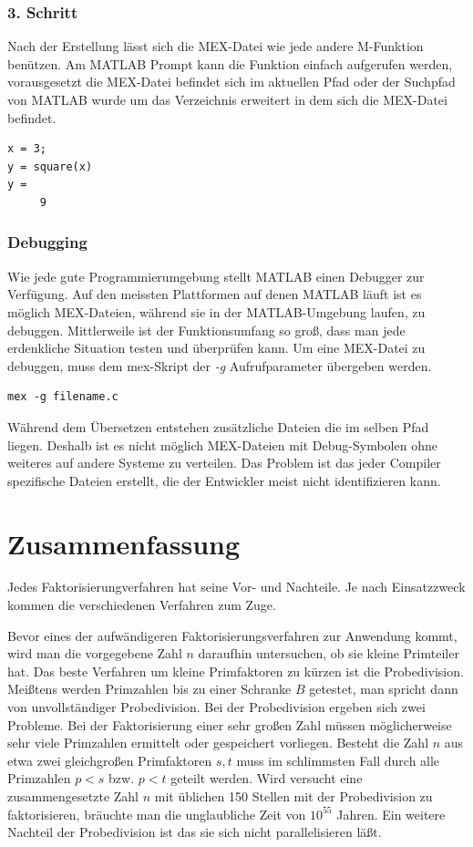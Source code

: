 \documentclass[a4paper,11pt]{article}
\begin{document}
\subsubsection*{3. Schritt}
Nach der Erstellung lässt sich die MEX-Datei wie jede
andere M-Funktion benützen. Am MATLAB Prompt kann die
Funktion einfach aufgerufen werden, vorausgesetzt die
MEX-Datei befindet sich im aktuellen Pfad oder der Suchpfad
von MATLAB wurde um das Verzeichnis erweitert in dem sich
die MEX-Datei befindet.
\begin{verbatim}
x = 3;
y = square(x)
y =
     9
\end{verbatim}

\subsubsection*{Debugging}
Wie jede gute Programmierumgebung stellt MATLAB einen Debugger zur Verfügung.
Auf den meissten Plattformen auf denen MATLAB läuft ist es möglich MEX-Dateien,
während sie in der MATLAB-Umgebung laufen, zu debuggen. Mittlerweile ist der 
Funktionsumfang so groß, dass man jede erdenkliche Situation testen und 
überprüfen kann. Um eine MEX-Datei zu debuggen, muss dem mex-Skript der
\textit{-g} Aufrufparameter übergeben werden. 
\begin{verbatim}
mex -g filename.c
\end{verbatim}

Während dem Übersetzen entstehen zusätzliche Dateien die im selben Pfad 
liegen. Deshalb ist es nicht möglich MEX-Dateien mit Debug-Symbolen ohne
weiteres auf andere Systeme zu verteilen. Das Problem ist das jeder Compiler
spezifische Dateien erstellt, die der Entwickler meist nicht identifizieren
kann.

\section{Zusammenfassung}
Jedes Faktorisierungverfahren hat seine Vor- und Nachteile. Je nach Einsatzzweck
kommen die verschiedenen Verfahren zum Zuge. 

Bevor eines der aufwändigeren Faktorisierungsverfahren zur Anwendung kommt, wird
man die vorgegebene Zahl $n$ daraufhin untersuchen, ob sie kleine Primteiler hat.
Das beste Verfahren um  kleine Primfaktoren zu kürzen ist die Probedivision.
Meißtens werden Primzahlen bis zu einer Schranke $B$ getestet, man spricht dann
von unvollständiger Probedivision. Bei der Probedivision ergeben sich zwei
Probleme. Bei der Faktorisierung einer sehr großen Zahl müssen möglicherweise 
sehr viele Primzahlen ermittelt oder gespeichert vorliegen. Besteht die Zahl $n$
aus etwa zwei gleichgroßen Primfaktoren $s,t$ muss im schlimmsten Fall durch 
alle Primzahlen $p<s$ bzw. $p<t$ geteilt werden.
Wird versucht eine zusammengesetzte Zahl $n$ mit üblichen 150 Stellen mit der
Probedivision zu faktorisieren, bräuchte man die unglaubliche Zeit von $10^{55}$
Jahren. Ein weitere Nachteil der Probedivision ist das sie sich nicht 
parallelisieren läßt.
\end{document}
